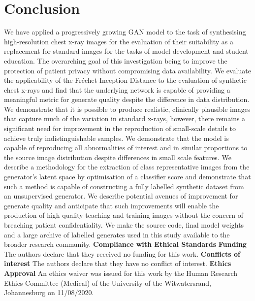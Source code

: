 \documentclass{article}
\begin{document}
\section{Conclusion}
\label{sec:conclusion}
We have applied a progressively growing GAN model to the task of synthesising high-resolution chest x-ray images for the evaluation of their suitability as a replacement for standard images for the tasks of model development and student education. The overarching goal of this investigation being to improve the protection of patient privacy without compromising data availability. We evaluate the applicability of the Fréchet Inception Distance to the evaluation of synthetic chest x-rays and find that the underlying network is capable of providing a meaningful metric for generate quality despite the difference in data distribution. We demonstrate that it is possible to produce realistic, clinically plausible images that capture much of the variation in standard x-rays, however, there remains a significant need for improvement in the reproduction of small-scale details to achieve truly indistinguishable samples. We demonstrate that the model is capable of reproducing all abnormalities of interest and in similar proportions to the source image distribution despite differences in small scale features. We describe a methodology for the extraction of class representative images from the generator's latent space by optimisation of a classifier score and demonstrate that such a method is capable of constructing a fully labelled synthetic dataset from an unsupervised generator. We describe potential avenues of improvement for generate quality and anticipate that such improvements will enable the production of high quality teaching and training images without the concern of breaching patient confidentiality. We make the source code, final model weights and a large archive of labelled generates used in this study available to the broader research community.
\newline \newline
\textbf{Compliance with Ethical Standards}
\newline
\textbf{Funding} The authors declare that they received no funding for this work.
\newline
\textbf{Conflicts of interest} The authors declare that they have no conflict of interest.
\newline
\textbf{Ethics Approval} An ethics waiver was issued for this work by the Human Research Ethics Committee (Medical) of the University of the Witwatersrand, Johannesburg on 11/08/2020.

\printbibliography
\end{document}
